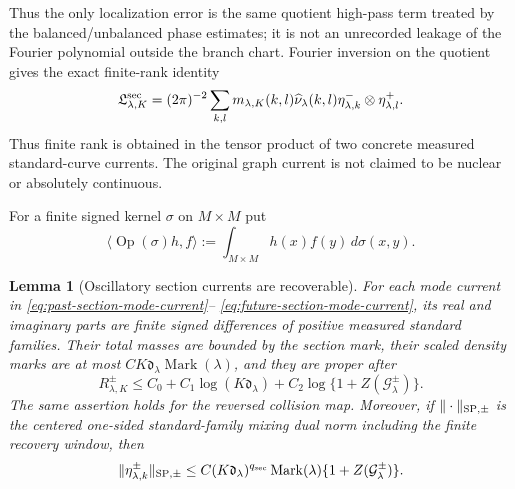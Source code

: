 \documentclass[11pt]{article}
\newtheorem{lemma}[theorem]{Lemma}
\begin{document}
Thus the only localization error is the same quotient high-pass term treated
by the balanced/unbalanced phase estimates; it is not an unrecorded leakage
of the Fourier polynomial outside the branch chart.
Fourier inversion on the quotient gives the exact
finite-rank identity
\begin{equation}
\label{eq:section-current-finite-rank}
 \mathfrak L^{\rm sec}_{\lambda,K}
 =(2\pi)^{-2}\sum_{k,l}
 m_{\lambda,K}(k,l)\widehat\nu_\lambda(k,l)
 \eta^-_{\lambda,k}\otimes\eta^+_{\lambda,l}.
\end{equation}
Thus finite rank is obtained in the tensor product of two concrete measured
standard-curve currents.  The original graph current is not claimed to be
nuclear or absolutely continuous.

For a finite signed kernel $\sigma$ on $M\times M$ put
\begin{equation}
\label{eq:kernel-operator-identification}
 \langle\operatorname{Op}(\sigma)h,f\rangle
 :=\int_{M\times M}h(x)f(y)\,d\sigma(x,y).
\end{equation}
\begin{lemma}[Oscillatory section currents are recoverable]
\label{lem:oscillatory-section-recovery}
For each mode current in
\eqref{eq:past-section-mode-current}--
\eqref{eq:future-section-mode-current}, its real and imaginary parts are
finite signed differences of positive measured standard families.  Their
total masses are bounded by the section mark, their scaled density marks are
at most
$CK\mathfrak d_\lambda\operatorname{Mark}(\lambda)$, and they are proper after
\begin{equation}
\label{eq:section-mode-recovery-time}
 R_{\lambda,K}^{\pm}\le C_0+C_1\log(K\mathfrak d_\lambda)
 +C_2\log\{1+Z(\mathcal G_\lambda^\pm)\}.
\end{equation}
The same assertion holds for the reversed collision map.
Moreover, if $\|\cdot\|_{\rm SP,\pm}$ is the centered one-sided
standard-family mixing dual norm including the finite recovery window, then
\begin{equation}
\label{eq:section-mode-dual-cost}
 \|\eta^\pm_{\lambda,k}\|_{\rm SP,\pm}
 \le C(K\mathfrak d_\lambda)^{q_{\rm sec}}
 \operatorname{Mark}(\lambda)\{1+Z(\mathcal G_\lambda^\pm)\}.
\end{equation}
\end{lemma}
\end{document}
